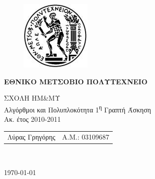 \begin{titlepage}
\begin{center}
\begin{figure}[t] 
     \includegraphics[scale=0.7]{title/ntua_logo}
\end{figure}
\begin{LARGE}\textbf{ΕΘΝΙΚΟ ΜΕΤΣΟΒΙΟ ΠΟΛΥΤΕΧΝΕΙΟ\\}\end{LARGE}
\vspace{5cm}
\begin{Large}
ΣΧΟΛΗ ΗΜ\&ΜΥ\\
Αλγόρθμοι και Πολυπλοκότητα
1\textsuperscript{η} Γραπτή Άσκηση\\
Ακ. έτος 2010-2011\\
\end{Large}
\vspace{12cm}
\begin{tabular}{l r}
\Large{Λύρας Γρηγόρης}&
\large{Α.Μ.: 03109687}\\
\end{tabular}\\
\vspace{1cm}

\vfill
\large\today\\
\end{center}
\end{titlepage}

